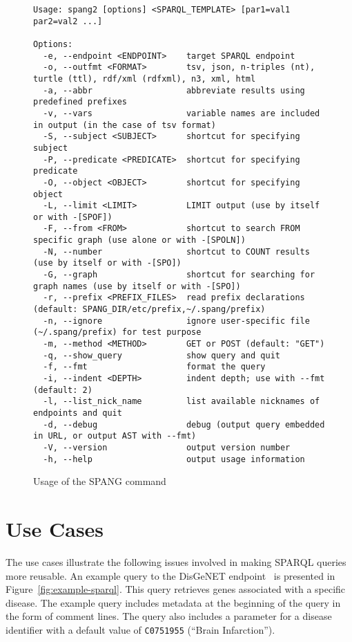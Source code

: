 \documentclass[runningheads]{llncs}
\begin{document}
\begin{figure}[!t]
\begin{scriptsize}
\begin{verbatim}
Usage: spang2 [options] <SPARQL_TEMPLATE> [par1=val1 par2=val2 ...]

Options:
  -e, --endpoint <ENDPOINT>    target SPARQL endpoint
  -o, --outfmt <FORMAT>        tsv, json, n-triples (nt), turtle (ttl), rdf/xml (rdfxml), n3, xml, html
  -a, --abbr                   abbreviate results using predefined prefixes
  -v, --vars                   variable names are included in output (in the case of tsv format)
  -S, --subject <SUBJECT>      shortcut for specifying subject
  -P, --predicate <PREDICATE>  shortcut for specifying predicate
  -O, --object <OBJECT>        shortcut for specifying object
  -L, --limit <LIMIT>          LIMIT output (use by itself or with -[SPOF])
  -F, --from <FROM>            shortcut to search FROM specific graph (use alone or with -[SPOLN])
  -N, --number                 shortcut to COUNT results (use by itself or with -[SPO])
  -G, --graph                  shortcut for searching for graph names (use by itself or with -[SPO])
  -r, --prefix <PREFIX_FILES>  read prefix declarations (default: SPANG_DIR/etc/prefix,~/.spang/prefix)
  -n, --ignore                 ignore user-specific file (~/.spang/prefix) for test purpose
  -m, --method <METHOD>        GET or POST (default: "GET")
  -q, --show_query             show query and quit
  -f, --fmt                    format the query
  -i, --indent <DEPTH>         indent depth; use with --fmt (default: 2)
  -l, --list_nick_name         list available nicknames of endpoints and quit
  -d, --debug                  debug (output query embedded in URL, or output AST with --fmt)
  -V, --version                output version number
  -h, --help                   output usage information

\end{verbatim}
\end{scriptsize}
\caption{Usage of the SPANG command}
\label{fig:spang-command}
\end{figure}


\section{Use Cases}
The use cases illustrate the following issues involved in making SPARQL queries more reusable.
An example query to the DisGeNET endpoint~\cite{disgenet} is presented in Figure~\ref{fig:example-sparql}.
This query retrieves genes associated with a specific disease.
The example query includes metadata at the beginning of the query in the form of comment lines.
The query also includes a parameter for a disease identifier with a default value of \texttt{C0751955} (``Brain Infarction'').
\end{document}
